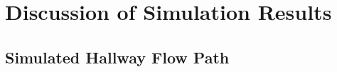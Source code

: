 \documentclass[12pt,oneside]{book}
\begin{document}
\chapter{Discussion of Simulation Results}
\label{sec:discussion}


\section{Simulated Hallway Flow Path}
\label{sec:simulated_flow_path}


\end{document}
